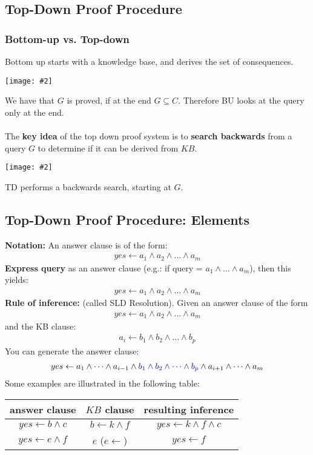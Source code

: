 \documentclass{article}
\def\blu#1{{\color{blu}#1}}
\newcommand{\centerfig}[2]{\begin{center}\texttt{[image: \#2]}\end{center}}
\begin{document}
\subsection*{Top-Down Proof Procedure}
\subsubsection*{Bottom-up vs. Top-down}
Bottom up starts with a knowledge base, and derives the set of consequences. 
\centerfig{0.5}{bottom-up-1}
We have that $ G $ is proved, if at the end $ G \subseteq C $. Therefore BU looks at the query only at the end. \\
\\
The \textbf{key idea} of the top down proof system is to \textbf{search backwards} from a query $ G $ to determine if it can be derived from $ KB $. 
\centerfig{0.5}{top-down-1}
TD performs a backwards search, starting at $ G $.
\subsection*{Top-Down Proof Procedure: Elements}
\textbf{Notation:} An \blu{answer clause} is of the form:
\begin{align*}
yes \leftarrow a_1 \land a_2 \land \dots \land a_m
\end{align*}
\textbf{Express query} as an \blu{answer clause} (e.g.: if query = $ a_1 \land \dots \land a_m $), then this yields:
\begin{align*}
yes \leftarrow a_1 \land a_2 \land \dots \land a_m
\end{align*}
\textbf{Rule of inference:} (called SLD Resolution). Given an answer clause of the form
\begin{align*}
yes \leftarrow a_1 \land a_2 \land \dots \land a_m
\end{align*}
and the KB clause:
\begin{align*}
a_i \leftarrow b_1 \land b_2 \land \dots \land b_p
\end{align*}
You can generate the answer clause:
\begin{align*}
yes \leftarrow a_1 \land \dots \land a_{i-1} \land \blu{b_1 \land b_2 \land \dots \land b_p} \land a_{i+1} \land \dots \land a_m
\end{align*}
Some examples are illustrated in the following table:
\begin{center}
\begin{tabular}{| c | c | c |}
	\hline
	answer clause & $ KB $ clause & resulting inference \\
	\hline
	$ yes \leftarrow b \land c $ & $ b \leftarrow k \land f $ & $ yes \leftarrow k \land f \land c $\\
	\hline
	$ yes \leftarrow e \land f $ & $ e $ ($ e \leftarrow $) & $ yes \leftarrow f $\\
	 \hline
\end{tabular}
\end{center}
\end{document}
